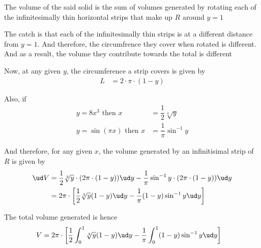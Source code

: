 \begin{parts}
\begin{solution}[\halfpage]
  	The volume of the said solid is the sum of volumes generated by rotating 
  	each of the infinitesimally thin horizontal strips that make up $R$ around
  	$y = 1$
  	
  	The catch is that each of the infinitesimally thin strips is at a different
  	distance from $y=1$. And therefore, the circumfrence they cover when rotated is
  	different. And as a result, the volume they contribute towards the total is 
  	different
  	
  	Now, at any given $y$, the circumference a strip covers is given by
  	\begin{align}
  		L &= 2\cdot\pi\cdot(1-y)
	\end{align}
	
  	
  	Also, if 
  	\begin{align}
		y = 8x^3 \text{ then } x &= \dfrac{1}{2}\sqrt[3]{y} \\
		y = \sin(\pi x) \text{ then } x &= \dfrac{1}{\pi}\sin^{-1}y
  	\end{align}
  	
  	And therefore, for any given $x$, the volume generated by an infinitisimal strip of $R$ is given by
  	\begin{align}
  		\ud V &= \dfrac{1}{2}\sqrt[3]{y}\cdot(2\pi\cdot(1-y))\ud y -
  		         \dfrac{1}{\pi}\sin^{-1}y\cdot(2\pi\cdot(1-y))\ud y \\
  		      &= 2\pi\cdot\left[ \dfrac{1}{2}\sqrt[3]{y}(1-y)\ud y -
  		         \dfrac{1}{\pi}(1-y)\sin^{-1}y\ud y \right]
  	\end{align}
  	
  	The total volume generated is hence
  	\begin{align}
  		V &= 2\pi\cdot\left[ \dfrac{1}{2}\int_0^1\sqrt[3]{y}(1-y)\ud y -
  		         \dfrac{1}{\pi}\int_0^1(1-y)\sin^{-1}y\ud y \right]
  	\end{align}
  \end{solution}

\end{parts}
